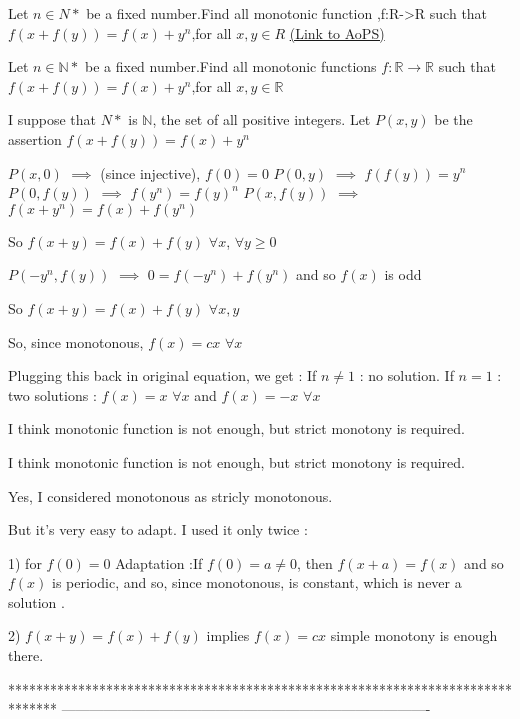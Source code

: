 \begin{problem}
	Let $n \in N*$ be a fixed number.Find all monotonic function ,f:R->R such that $f(x+f(y))=f(x)+y^n$,for all $x,y \in R$
	\flushright \href{https://artofproblemsolving.com/community/c6h563940}{(Link to AoPS)}
\end{problem}



\begin{solution}
	\begin{tcolorbox}Let $n \in \mathbb N*$ be a fixed number.Find all monotonic functions $f:\mathbb R \to \mathbb R$ such that $f(x+f(y))=f(x)+y^n$,for all $x,y \in \mathbb R$\end{tcolorbox}
I suppose that $N*$ is $\mathbb N$, the set of all positive integers.
Let $P(x,y)$ be the assertion $f(x+f(y))=f(x)+y^n$

$P(x,0)$ $\implies$ (since injective), $f(0)=0$
$P(0,y)$ $\implies$ $f(f(y))=y^n$
$P(0,f(y))$ $\implies$ $f(y^n)=f(y)^n$
$P(x,f(y))$ $\implies$ $f(x+y^n)=f(x)+f(y^n)$

So $f(x+y)=f(x)+f(y)$ $\forall x$, $\forall y\ge 0$

$P(-y^n,f(y))$ $\implies$ $0=f(-y^n)+f(y^n)$ and so $f(x)$ is odd

So $f(x+y)=f(x)+f(y)$ $\forall x,y$

So, since monotonous, $f(x)=cx$ $\forall x$

Plugging this back in original equation, we get  :
If $n\ne 1$ : no solution.
If $n=1$ : two solutions : $\boxed{f(x)=x}$ $\forall x$ and $\boxed{f(x)=-x}$ $\forall x$
\end{solution}



\begin{solution}
	I think monotonic function is not enough, but strict monotony is required.
\end{solution}



\begin{solution}
	\begin{tcolorbox}I think monotonic function is not enough, but strict monotony is required.\end{tcolorbox}
Yes, I considered monotonous as stricly monotonous.

But it's very easy to adapt. I used it only twice :

1) for $f(0)=0$
Adaptation :If $f(0)=a\ne 0$, then $f(x+a)=f(x)$ and so $f(x)$ is periodic, and so, since monotonous, is constant, which is never a solution .

2) $f(x+y)=f(x)+f(y)$ implies $f(x)=cx$
simple monotony is enough there.
\end{solution}
*******************************************************************************
-------------------------------------------------------------------------------

